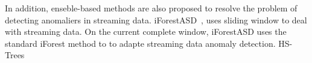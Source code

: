 In addition,
enseble-based methods are also proposed to 
resolve the problem of detecting anomaliers 
in streaming data.
iForestASD~\cite{ding2013anomaly},
uses sliding window to deal with streaming
data.
On the current complete window, 
iForestASD uses the standard 
iForest method to to adapte streaming 
data anomaly detection.
HS-Trees~\cite{tan2011fast} 


